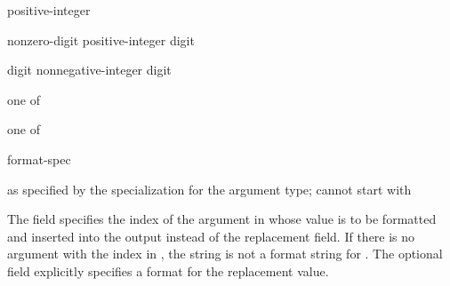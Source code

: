 \begin{ncbnf}
\br
    \br
    positive-integer
\end{ncbnf}

\begin{ncbnf}
\br
    nonzero-digit\br
    positive-integer digit
\end{ncbnf}

\begin{ncbnf}
\br
    digit\br
    nonnegative-integer digit
\end{ncbnf}

\begin{ncbnf}
 \textnormal{one of}\br
\end{ncbnf}

\begin{ncbnf}
 \textnormal{one of}\br
\end{ncbnf}

\begin{ncbnf}
\br
    \terminal{:} format-spec
\end{ncbnf}

\begin{ncbnf}
\br
    \textnormal{as specified by the  specialization for the argument type; cannot start with \terminal{\}} }
\end{ncbnf}

\pnum
The  field specifies the index of
the argument in 
whose value is to be formatted and inserted into the output
instead of the replacement field.
If there is no argument with
the index  in ,
the string is not a format string for .
The optional  field
explicitly specifies a format for the replacement value.

\pnum
\begin{example}
\begin{codeblock}
string s = format("{0}-{{", 8);         // value of  is 
\end{codeblock}
\end{example}

